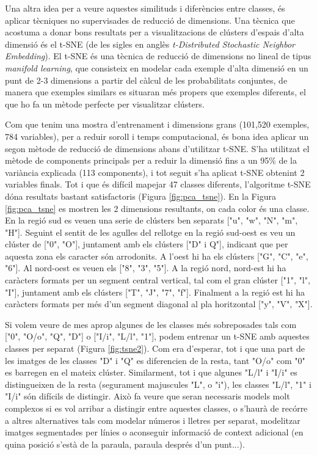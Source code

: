 \documentclass[12pt, spanish]{article}
\begin{document}
Una altra idea per a veure aquestes similituds i diferències entre classes, és aplicar tècniques no supervisades de reducció de dimensions. Una tècnica que acostuma a donar bons resultats per a visualitzacions de clústers d'espais d'alta dimensió és el t-SNE (de les sigles en anglès \textit{t-Distributed Stochastic Neighbor Embedding}). El t-SNE és una tècnica de reducció de dimensions no lineal de tipus \textit{manifold learning}, que consisteix en modelar cada exemple d'alta dimensió en un punt de 2-3 dimensions a partir del càlcul de les probabilitats conjuntes, de manera que exemples similars es situaran més propers que exemples diferents, el que ho fa un mètode perfecte per visualitzar clústers.

Com que tenim una mostra d'entrenament i dimensions grans (101,520 exemples, 784 variables), per a reduir soroll i temps computacional, és bona idea aplicar un segon mètode de reducció de dimensions abans d'utilitzar t-SNE. S'ha utilitzat el mètode de components principals per a reduir la dimensió fins a un 95\% de la variància explicada (113 components), i tot seguit s'ha aplicat t-SNE obtenint 2 variables finals. Tot i que és difícil mapejar 47 classes diferents, l'algoritme t-SNE dóna resultats bastant satisfactoris (Figura \ref{fig:pca_tsne}). En la Figura \ref{fig:pca_tsne} es mostren les 2 dimensions resultants, on cada color és una classe. En la regió sud es veuen una serie de clústers ben separats ["u", "w", "N", "m", "H"]. Seguint el sentit de les agulles del rellotge en la regió sud-oest es veu un clúster de ["0", "O"], juntament amb els clústers ["D" i Q"], indicant que per aquesta zona els caracter són arrodonits. A l'oest hi ha els clústers ["G", "C", "e", "6"]. Al nord-oest es veuen els ["8", "3", "5"]. A la regió nord, nord-est hi ha caràcters formats per un segment central vertical, tal com el gran clúster ["1", "l", "I"], juntament amb els clústers ["T", "J", "7", "f"]. Finalment a la regió est hi ha caràcters formats per més d'un segment diagonal al pla horitzontal ["y", "V", "X"]. 

Si volem veure de mes aprop algunes de les classes més sobreposades tals com ["0", "O/o", "Q", "D"] o ["I/i", "L/l", "1"], podem entrenar un t-SNE amb aquestes classes per separat (Figura \ref{fig:tsne2}). Com era d'esperar, tot i que una part de les imatges de les classes "D" i "Q" es diferencien de la resta, tant "O/o" com "0" es barregen en el mateix clúster. Similarment, tot i que algunes "L/l" i "I/i" es distingueixen de la resta (segurament majuscules "L", o "i"), les classes "L/l", "1" i "I/i" són difícils de distingir. Això fa veure que seran necessaris models molt complexos si es vol arribar a distingir entre aquestes classes, o s'haurà de recórre a altres alternatives tals com modelar números i lletres per separat, modelitzar imatges segmentades per línies o aconseguir informació de context adicional (en quina posició s'està de la paraula, paraula després d'un punt...).
\end{document}
